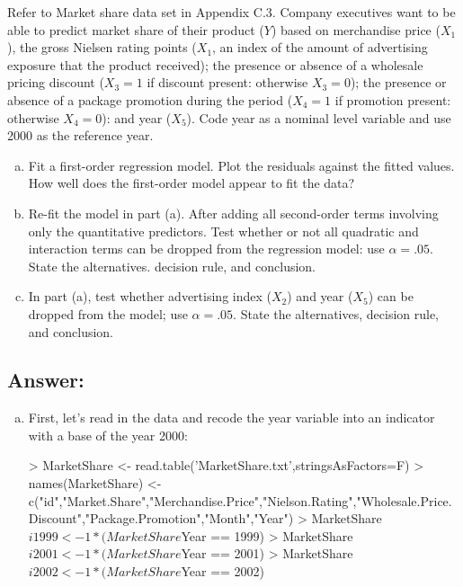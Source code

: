 \documentclass{article}
\begin{document}
Refer to Market share data set in Appendix C.3. Company executives want to be able to predict market share of their product ($Y$) based on merchandise price ($X_1$), the gross Nielsen rating points ($X_1$, an index of the amount of advertising exposure that the product received); the presence or absence of a wholesale pricing discount ($X_3 = 1$ if discount present: otherwise $X_3 = 0$); the presence or absence of a package promotion during the period ($X_4 = 1$ if promotion present: otherwise $X_4 = 0$): and year ($X_5$). Code year as a nominal level variable and use 2000 as the reference year.

\begin{enumerate}[a)]
\item{} Fit a first-order regression model. Plot the residuals against the fitted values. How well does the first-order model appear to fit the data?
\item{} Re-fit the model in part (a). After adding all second-order terms involving only the quantitative predictors. Test whether or not all quadratic and interaction terms can be dropped from the regression model: use $\alpha = .05$. State the alternatives. decision rule, and conclusion.
\item{} In part (a), test whether advertising index ($X_2$) and year ($X_5$) can be dropped from the model; use $\alpha = .05$. State the alternatives, decision rule, and conclusion.
\end{enumerate}

\subsection{Answer:}

\begin{enumerate}[a)]
\item{} First, let's read in the data and recode the year variable into an indicator with a base of the year 2000:

\begin{Schunk}
\begin{Sinput}
> MarketShare <- read.table('MarketShare.txt',stringsAsFactors=F)
> names(MarketShare) <- c("id","Market.Share","Merchandise.Price","Nielson.Rating","Wholesale.Price.Discount","Package.Promotion","Month","Year")
> MarketShare$i1999 <- 1*(MarketShare$Year == 1999)
> MarketShare$i2001 <- 1*(MarketShare$Year == 2001) 
> MarketShare$i2002 <- 1*(MarketShare$Year == 2002)
\end{Sinput}
\end{Schunk}

\end{enumerate}
\end{document}
